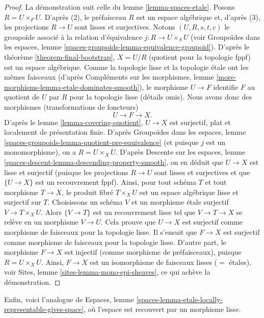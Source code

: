 \begin{proof}
La démonstration suit celle du lemme \ref{lemma-spaces-etale}. Posons
$R = U \times_F U$. D'après (2), le préfaisceau $R$ est un espace algébrique et, d'après (3),
les projections $R \to U$ sont lisses et surjectives. Notons $(U, R, s, t, c)$
le groupoïde associé à la relation d'équivalence $j : R \to U \times_S U$
(voir Groupoïdes dans les espaces, lemme
\ref{spaces-groupoids-lemma-equivalence-groupoid}).
D'après le théorème \ref{theorem-final-bootstrap}, $X = U/R$ (quotient
pour la topologie fppf) est un espace algébrique. Comme la topologie lisse
et la topologie étale ont les mêmes faisceaux (d'après
Compléments sur les morphismes, lemme \ref{more-morphisms-lemma-etale-dominates-smooth}),
le morphisme $U \to F$ identifie $F$ au quotient de
$U$ par $R$ pour la topologie lisse (détails omis).
Nous avons donc des morphismes (transformations de foncteurs)
$$
U \to F \to X.
$$
D'après le lemme \ref{lemma-covering-quotient}, $U \to X$ est
surjectif, plat et localement de présentation finie. D'après
Groupoïdes dans les espaces, lemme
\ref{spaces-groupoids-lemma-quotient-pre-equivalence}
(et puisque $j$ est un monomorphisme), on a $R = U \times_X U$. D'après
Descente sur les espaces, lemme \ref{spaces-descent-lemma-descending-property-smooth},
on en déduit que $U \to X$ est lisse et surjectif (puisque les projections
$R \to U$ sont lisses et surjectives et que $\{U \to X\}$ est un recouvrement
fppf). Ainsi, pour tout schéma $T$ et tout morphisme $T \to X$, le produit fibré
$T \times_X U$ est un espace algébrique lisse et surjectif sur $T$.
Choisissons un schéma $V$ et un morphisme étale surjectif $V \to T \times_X U$.
Alors $\{V \to T\}$ est un recouvrement lisse tel que $V \to T \to X$
se relève en un morphisme $V \to U$. Cela prouve que
$U \to X$ est surjectif comme morphisme de faisceaux pour la topologie lisse.
Il s'ensuit que $F \to X$ est surjectif comme morphisme de faisceaux pour la topologie
lisse. D'autre part, le morphisme $F \to X$ est injectif (comme morphisme
de préfaisceaux), puisque $R = U \times_X U$.
Ainsi, $F \to X$ est un isomorphisme de faisceaux lisses ($=$ étales),
voir Sites, lemme \ref{sites-lemma-mono-epi-sheaves},
ce qui achève la démonstration.
\end{proof}

\noindent
Enfin, voici l'analogue de
Espaces, lemme \ref{spaces-lemma-etale-locally-representable-gives-space},
où l'espace est recouvert par un morphisme lisse.

